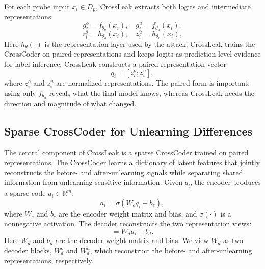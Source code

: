  
For each probe input $x_i\in D_p$, CrossLeak extracts both logits and intermediate representations:
\begin{equation}
	g_i^o = f_{\theta_o}(x_i), \quad g_i^u = f_{\theta_u}(x_i),
	\label{eq:paired_logits}
\end{equation}
\begin{equation}
	z_i^o = h_{\theta_o}(x_i), \quad z_i^u = h_{\theta_u}(x_i),
	\label{eq:paired_representations}
\end{equation}
Here $h_{\theta}(\cdot)$ is the representation layer used by the attack. CrossLeak trains the CrossCoder on paired representations and keeps logits as prediction-level evidence for label inference. CrossLeak constructs a paired representation vector
\begin{equation}
    q_i = [\bar z_i^o; \bar z_i^u],
    \label{eq:crossleak_input}
\end{equation}
where $\bar z_i^o$ and $\bar z_i^u$ are normalized representations. The paired form is important: using only $f_{\theta_u}$ reveals what the final model knows, whereas CrossLeak needs the direction and magnitude of what changed.


\subsection{Sparse CrossCoder for Unlearning Differences}
\label{sec:approach_crosscoder}

The central component of CrossLeak is a sparse CrossCoder trained on paired representations. The CrossCoder learns a dictionary of latent features that jointly reconstructs the before- and after-unlearning signals while separating shared information from unlearning-sensitive information. Given $q_i$, the encoder produces a sparse code $a_i\in \mathbb{R}^{m}$:
\begin{equation}
    a_i = \sigma(W_e q_i + b_e),
    \label{eq:crosscoder_encoding}
\end{equation}
where $W_e$ and $b_e$ are the encoder weight matrix and bias, and $\sigma(\cdot)$ is a nonnegative activation. The decoder reconstructs the two representation views:
\begin{equation}
    [\hat z_i^o;\hat z_i^u] = W_d a_i + b_d.
    \label{eq:crosscoder_decoding}
\end{equation}
Here $W_d$ and $b_d$ are the decoder weight matrix and bias. We view $W_d$ as two decoder blocks, $W_d^o$ and $W_d^u$, which reconstruct the before- and after-unlearning representations, respectively.

